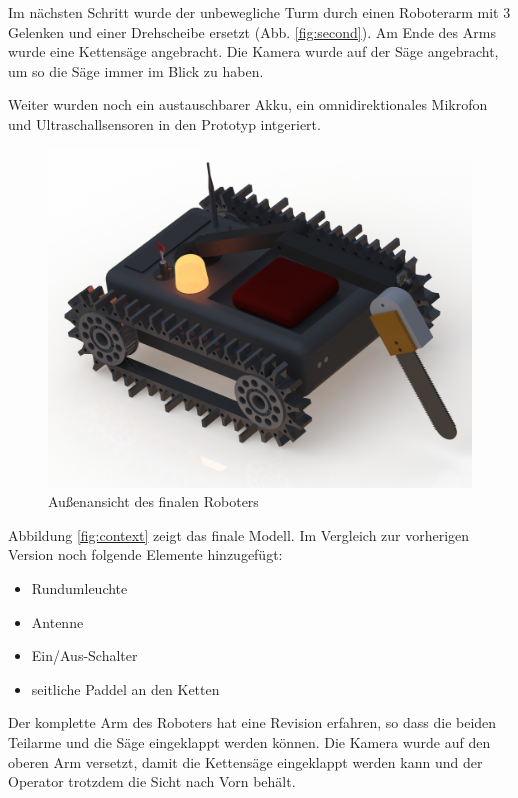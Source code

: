 Im nächsten Schritt wurde der unbewegliche Turm durch einen Roboterarm mit 3 Gelenken und einer Drehscheibe ersetzt (Abb. \ref{fig:second}). Am Ende des Arms wurde eine Kettensäge angebracht. Die Kamera wurde auf der Säge angebracht, um so die Säge immer im Blick zu haben.

Weiter wurden noch ein austauschbarer Akku, ein omnidirektionales Mikrofon und Ultraschallsensoren in den Prototyp intgeriert.\\
\begin{figure}[h]
    \centering
    \captionsetup{width=.9\linewidth}
    \includegraphics[width=1\linewidth]{trimetrisch_vorne_rechts_oben.JPG}
    \caption{Außenansicht des finalen Roboters}
    \label{fig:final}
\end{figure}
Abbildung \ref{fig:context} zeigt das finale Modell. Im Vergleich  zur vorherigen Version noch folgende Elemente hinzugefügt:
\begin{itemize}
    \item Rundumleuchte
    \item Antenne
    \item Ein/Aus-Schalter
    \item seitliche Paddel an den Ketten\\
\end{itemize}

Der komplette Arm des Roboters hat eine Revision erfahren, so dass die beiden Teilarme und die Säge eingeklappt werden können. Die Kamera wurde auf den oberen Arm versetzt, damit die Kettensäge eingeklappt werden kann und der Operator trotzdem die Sicht nach Vorn behält.

